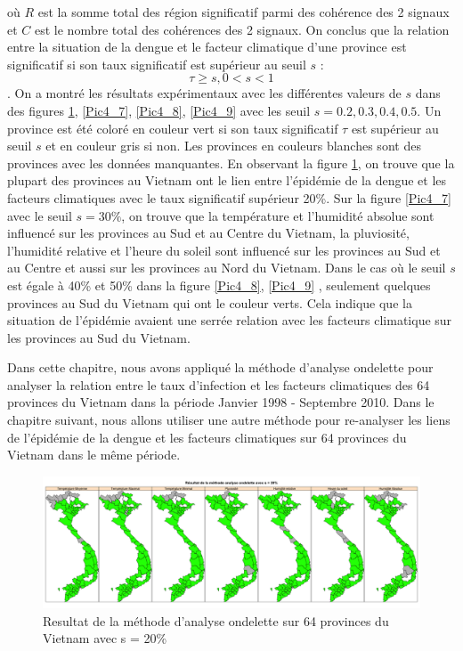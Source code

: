 où $R$ est la somme total des région significatif parmi des cohérence des 2 signaux et $C$ est le nombre total des cohérences des 2 signaux. On conclus que la relation entre la situation de la dengue et le facteur climatique d'une province est significatif si son taux significatif est supérieur au seuil $s$ : 
$$\tau \geq s, 0 < s < 1$$.
On a montré les résultats expérimentaux avec les différentes valeurs de $s$ dans des figures \ref{Pic4_6}, \ref{Pic4_7}, \ref{Pic4_8}, \ref{Pic4_9} avec les seuil $s =  0.2, 0.3, 0.4, 0.5$. Un province est été coloré en couleur vert si son taux significatif $\tau$ est supérieur au seuil $s$ et en couleur gris si non. Les provinces en couleurs blanches sont des provinces avec les données manquantes. En observant la figure \ref{Pic4_6}, on trouve que la plupart des provinces au Vietnam ont le lien entre l'épidémie de la dengue et les facteurs climatiques avec le taux significatif supérieur 20\%. Sur la figure  \ref{Pic4_7} avec le seuil $s = 30\%$, on trouve que la température et l'humidité absolue sont influencé sur les provinces au Sud et au Centre du Vietnam, la pluviosité, l'humidité relative et l'heure du soleil sont influencé sur les provinces au Sud et au Centre et aussi sur les provinces au Nord du Vietnam. Dans le cas où le seuil $s$ est égale à 40\% et 50\% dans la figure \ref{Pic4_8}, \ref{Pic4_9}  , seulement quelques provinces au Sud du Vietnam qui ont le couleur verts. Cela indique que la situation de l'épidémie avaient une serrée relation avec les facteurs climatique sur les provinces au Sud du Vietnam. 

Dans cette chapitre, nous avons appliqué la méthode d'analyse ondelette pour analyser la relation entre le taux d'infection et les facteurs climatiques des 64 provinces du Vietnam dans la période Janvier 1998 - Septembre 2010. Dans le chapitre suivant, nous allons utiliser une autre méthode pour re-analyser les liens de l'épidémie de la dengue et les facteurs climatiques sur 64 provinces du Vietnam dans le même période. 






\begin{figure}[h]
\includegraphics[width = \linewidth]{../figures/chap4/Pic4_6.png}
\caption{Resultat de la méthode d'analyse ondelette sur 64 provinces du Vietnam avec s = 20\%}
\label{Pic4_6}	
\end{figure}

